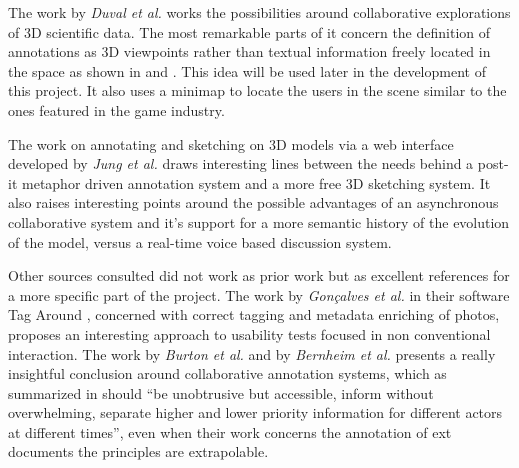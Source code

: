 The work by {\em Duval et al.} \cite{Duval} works the possibilities around collaborative explorations of 3D scientific data. The most remarkable parts of it concern the definition of annotations as 3D viewpoints rather than textual information freely located in the space as shown in \cite{Kadobayashi} and \cite{Sonnet}. This idea will be used later in the development of this project. It also uses a minimap to locate the users in the scene similar to the ones featured in the game industry.

The work on annotating and sketching on 3D models via a web interface developed by {\em Jung et al.} \cite{Jung} draws interesting lines between the needs behind a post-it metaphor driven annotation system and a more free 3D sketching system. It also raises interesting points around the possible advantages of an asynchronous collaborative system and it's support for a more semantic history of the evolution of the model, versus a real-time voice based discussion system.

Other sources consulted did not work as prior work but as excellent references for a more specific part of the project. The work by {\em Gonçalves et al.} in their software Tag Around \cite{Goncalves}, concerned with correct tagging and metadata enriching of photos, proposes an interesting approach to usability tests focused in non conventional interaction. The work by {\em Burton et al.}\cite{Burton} and by {\em Bernheim et al.}\cite{Bernheim} presents a really insightful conclusion around collaborative annotation systems, which as summarized in \cite{Jung} should ``be unobtrusive but accessible, inform without overwhelming, separate higher and lower priority information for different actors at different times'', even when their work concerns the annotation of ext documents the principles are extrapolable.
